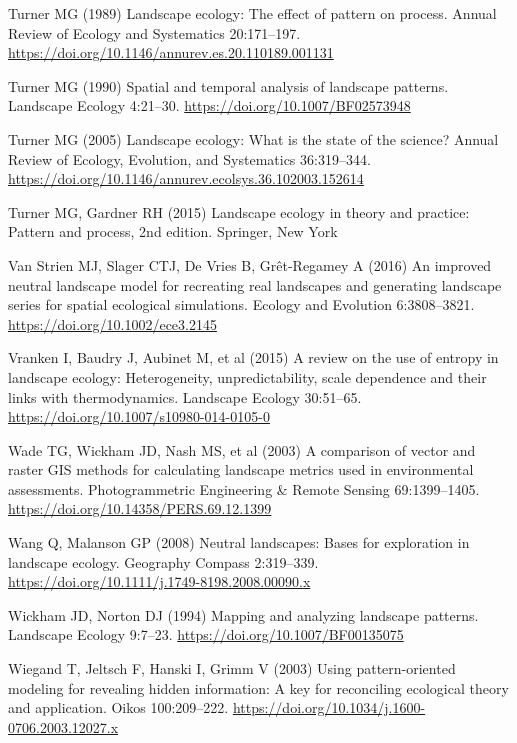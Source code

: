 \documentclass[
  10pt,
  a4paperpaper,
]{article}
\newlength{\cslhangindent}
\newenvironment{CSLReferences}[2] %
 {\begin{list}{}{%
  \setlength{\itemindent}{0pt}
  \setlength{\leftmargin}{0pt}
  \setlength{\parsep}{0pt}
  \ifodd #1
   \setlength{\leftmargin}{\cslhangindent}
   \setlength{\itemindent}{-1\cslhangindent}
  \fi
  \setlength{\itemsep}{#2\baselineskip}}}
 {\end{list}}
\begin{document}
\begin{CSLReferences}{1}{1}
Turner MG (1989) Landscape ecology: The effect of pattern on process.
Annual Review of Ecology and Systematics 20:171--197.
\url{https://doi.org/10.1146/annurev.es.20.110189.001131}

Turner MG (1990) Spatial and temporal analysis of landscape patterns.
Landscape Ecology 4:21--30. \url{https://doi.org/10.1007/BF02573948}

Turner MG (2005) Landscape ecology: What is the state of the science?
Annual Review of Ecology, Evolution, and Systematics 36:319--344.
\url{https://doi.org/10.1146/annurev.ecolsys.36.102003.152614}

Turner MG, Gardner RH (2015) Landscape ecology in theory and practice:
Pattern and process, 2nd edition. Springer, New York

Van Strien MJ, Slager CTJ, De Vries B, Grêt-Regamey A (2016) An improved
neutral landscape model for recreating real landscapes and generating
landscape series for spatial ecological simulations. Ecology and
Evolution 6:3808--3821. \url{https://doi.org/10.1002/ece3.2145}

Vranken I, Baudry J, Aubinet M, et al (2015) A review on the use of
entropy in landscape ecology: Heterogeneity, unpredictability, scale
dependence and their links with thermodynamics. Landscape Ecology
30:51--65. \url{https://doi.org/10.1007/s10980-014-0105-0}

Wade TG, Wickham JD, Nash MS, et al (2003) A comparison of vector and
raster GIS methods for calculating landscape metrics used in
environmental assessments. Photogrammetric Engineering \& Remote Sensing
69:1399--1405. \url{https://doi.org/10.14358/PERS.69.12.1399}

Wang Q, Malanson GP (2008) Neutral landscapes: Bases for exploration in
landscape ecology. Geography Compass 2:319--339.
\url{https://doi.org/10.1111/j.1749-8198.2008.00090.x}

Wickham JD, Norton DJ (1994) Mapping and analyzing landscape patterns.
Landscape Ecology 9:7--23. \url{https://doi.org/10.1007/BF00135075}

Wiegand T, Jeltsch F, Hanski I, Grimm V (2003) Using pattern-oriented
modeling for revealing hidden information: A key for reconciling
ecological theory and application. Oikos 100:209--222.
\url{https://doi.org/10.1034/j.1600-0706.2003.12027.x}


\end{CSLReferences}
\end{document}

